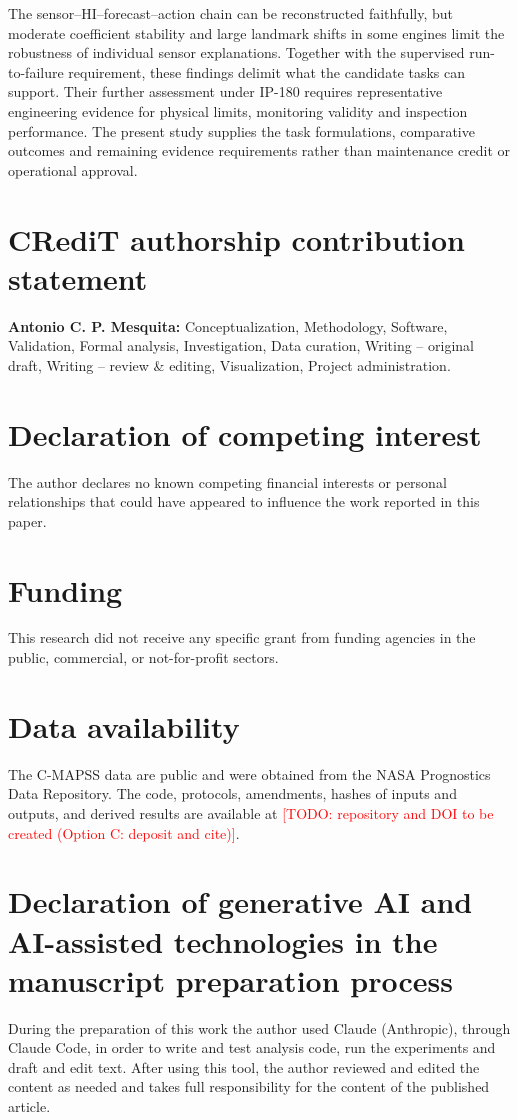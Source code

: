 \documentclass[preprint,12pt]{elsarticle}
\newcommand{\todo}[1]{\textcolor{red}{[TODO: #1]}}
\newcommand{\todo}[1]{}
\begin{document}
The sensor--HI--forecast--action chain can be reconstructed faithfully, but moderate coefficient stability and large landmark shifts in some engines limit the robustness of individual sensor explanations. Together with the supervised run-to-failure requirement, these findings delimit what the candidate tasks can support. Their further assessment under IP-180 requires representative engineering evidence for physical limits, monitoring validity and inspection performance. The present study supplies the task formulations, comparative outcomes and remaining evidence requirements rather than maintenance credit or operational approval.



\section*{CRediT authorship contribution statement}
\textbf{Antonio C. P. Mesquita:} Conceptualization, Methodology, Software, Validation, Formal analysis, Investigation, Data curation, Writing -- original draft, Writing -- review \& editing, Visualization, Project administration.

\section*{Declaration of competing interest}
The author declares no known competing financial interests or personal relationships that could have appeared to influence the work reported in this paper.

\section*{Funding}
This research did not receive any specific grant from funding agencies in the public, commercial, or not-for-profit sectors.

\section*{Data availability}
The C-MAPSS data are public and were obtained from the NASA Prognostics Data Repository. The code, protocols, amendments, hashes of inputs and outputs, and derived results are available at \todo{repository and DOI to be created (Option C: deposit and cite)}.

\section*{Declaration of generative AI and AI-assisted technologies in the manuscript preparation process}
During the preparation of this work the author used Claude (Anthropic), through Claude Code, in order to write and test analysis code, run the experiments and draft and edit text. After using this tool, the author reviewed and edited the content as needed and takes full responsibility for the content of the published article.





\end{document}
